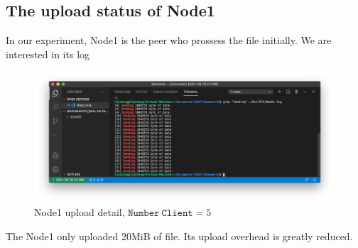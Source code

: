 \subsection{The upload status of Node1}
In our experiment, Node1 is the peer who prossess the file initially. We are interested in its log
\begin{figure}[H]
	\centering
	\includegraphics[scale=0.35]{img/upload}
	\caption{Node1 upload detail, $\mathtt{Number \ Client} = 5$}
	\label{upload}
\end{figure}
The Node1 only uploaded 20MiB of file. Its upload overhead is greatly reduced.